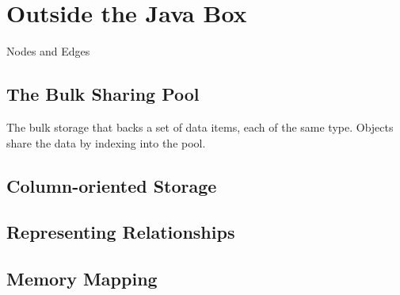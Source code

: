 
\chapter{Outside the Java Box}
\label{chapter:outisde-java-box}

\begin{example}{Nodes and Edges}

\end{example}

\section{The Bulk Sharing Pool}
\label{sec:bulk-sharing-pool}

The
bulk storage that backs a set of data items, each of the same type.
Objects share
the data by indexing into the pool.

\section{Column-oriented Storage}

\section{Representing Relationships}

\section{Memory Mapping}